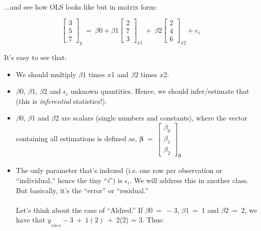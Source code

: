 \documentclass[10pt]{article}
\begin{document}
\paragraph{}...and see how OLS looks like but in matrix form:


\begin{equation*}
\begin{bmatrix}
3\\
5\\
7
\end{bmatrix}_{y} \ =\ \beta 0+\beta 1\begin{bmatrix}
2\\
7\\
3
\end{bmatrix}_{x1} \ +\ \beta 2\begin{bmatrix}
2\\
4\\
6
\end{bmatrix}_{x2} +e_{i}
\end{equation*}

It's easy to see that:

\begin{itemize}
\item We should multiply $\displaystyle \beta 1$ times $\displaystyle x$1 and $\displaystyle \beta 2$ times $\displaystyle x$2.

\item $\displaystyle \beta $0, $\displaystyle \beta $1, $\displaystyle \beta $2 and $\displaystyle \epsilon_{i}$ unknown quantities. Hence, we should infer/estimate that (this is \emph{inferential} statistics!). 

\item $\displaystyle \beta $0, $\displaystyle \beta $1 and $\displaystyle \beta $2 are scalars (single numbers and constants), where the vector containing all estimations is defined as, $\boldsymbol{\beta} \ =\ \begin{bmatrix} \beta_{0}\\\beta_{1}\\\beta_{2}\end{bmatrix}_{\boldsymbol{\beta}}$

\item The only parameter that's indexed (i.e. one row per observation or ``individual,'' hence the tiny ``\emph{i}'') is $\displaystyle \epsilon _{i}$. We will address this in another class. But basically, it's the ``error'' or ``residual.'' 
\\
\\
Let's think about the case of ``Aldred.''  If $\displaystyle \beta 0\ =\ -3$, $\displaystyle \beta 1\ =\ 1$ and $\displaystyle \beta 2\ =\ 2$, we have that $\displaystyle y_{_{\text{Alfred}}} -3\ +\ 1( 2) \ +\ $2(2) = 3. Thus:
\end{itemize}
\end{document}
